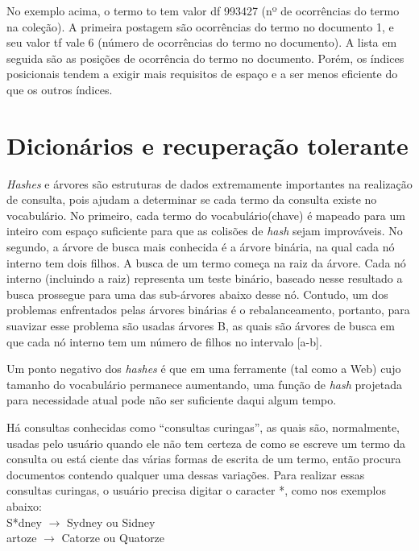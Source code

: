 No exemplo acima, o termo to tem valor df 993427 (nº de ocorrências do termo na coleção). A primeira postagem são ocorrências do termo no documento 1, e seu valor tf vale 6 (número de ocorrências do termo no documento). A lista em seguida são as posições de ocorrência do termo no documento. Porém, os índices posicionais tendem a exigir mais requisitos de espaço e a ser menos eficiente do que os outros índices.

\section{Dicionários e recuperação tolerante}
\label{sec:dicionarios}

  \emph{Hashes} e árvores são estruturas de dados extremamente importantes na realização de consulta, pois ajudam a determinar se cada termo da consulta existe no vocabulário. No primeiro, cada termo do vocabulário(chave) é mapeado para um inteiro com espaço suficiente para que as colisões de \emph{hash} sejam improváveis. No segundo, a árvore de busca mais conhecida é a árvore binária, na qual cada nó interno tem dois filhos. A busca de um termo começa na raiz da árvore. Cada nó interno (incluindo a raiz) representa um teste binário, baseado nesse resultado a busca prossegue para uma das sub-árvores abaixo desse nó. Contudo, um dos problemas enfrentados pelas árvores binárias é o rebalanceamento, portanto, para suavizar esse problema são usadas árvores B, as quais são árvores de busca em que cada nó interno tem um número de filhos no intervalo [a-b].
   
  Um ponto negativo dos \emph{hashes} é que em uma ferramente (tal como a Web) cujo tamanho do vocabulário permanece aumentando, uma função de \emph{hash} projetada para necessidade atual pode não ser suficiente daqui algum tempo.
  
  Há consultas conhecidas como ``consultas curingas'', as quais são, normalmente, usadas pelo usuário quando ele não tem certeza de como se escreve um termo da consulta ou está ciente das várias formas de escrita de um termo, então procura documentos contendo qualquer uma dessas variações. Para realizar essas consultas curingas, o usuário precisa digitar o caracter *, como nos exemplos abaixo: \\
    
\indent S*dney $\rightarrow$ Sydney ou Sidney \\
\indent *artoze $\rightarrow$ Catorze ou Quatorze \\

